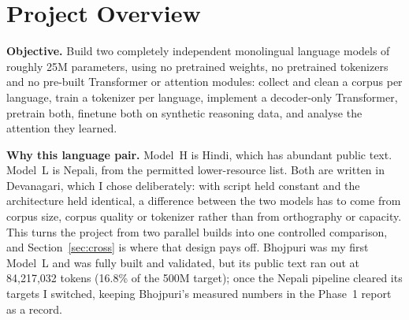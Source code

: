 \documentclass[10pt]{article}
\begin{document}
\section{Project Overview}

\textbf{Objective.} Build two completely independent monolingual language models of
roughly 25M parameters, using no pretrained weights, no pretrained tokenizers and no
pre-built Transformer or attention modules: collect and clean a corpus per language,
train a tokenizer per language, implement a decoder-only Transformer, pretrain both,
finetune both on synthetic reasoning data, and analyse the attention they learned.

\textbf{Why this language pair.} Model~H is Hindi, which has abundant public text.
Model~L is Nepali, from the permitted lower-resource list. Both are written in
Devanagari, which I chose deliberately: with script held constant and the
architecture held identical, a difference between the two models has to come from
corpus size, corpus quality or tokenizer rather than from orthography or capacity.
This turns the project from two parallel builds into one controlled comparison, and
Section~\ref{sec:cross} is where that design pays off. Bhojpuri was my first Model~L
and was fully built and validated, but its public text ran out at 84{,}217{,}032
tokens (16.8\% of the 500M target); once the Nepali pipeline cleared its targets I
switched, keeping Bhojpuri's measured numbers in the Phase~1 report as a record.
\end{document}
